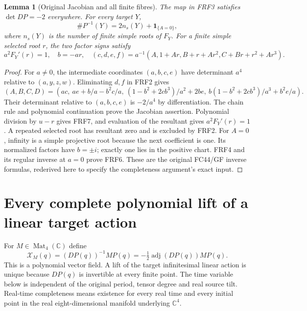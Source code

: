 \documentclass[11pt]{article}
\newtheorem{lemma}[theorem]{Lemma}
\newcommand{\C}{\mathbb C}
\newcommand{\adj}{\operatorname{adj}}
\begin{document}
\begin{lemma}[Original Jacobian and all finite fibres]\label{lem:fibres}
The map in FRF3 satisfies $\det DP=-2$ everywhere. For every target $Y$,
\[
 \#P^{-1}(Y)=2n_s(Y)+\mathbf1_{\{A=0\}},\tag{FRF6}
\]
where $n_s(Y)$ is the number of finite simple roots of $F_Y$.
For a finite simple selected root $r$, the two factor signs satisfy
\[
 a^2F_Y'(r)=1,\quad b=-ar,\quad
 (c,d,e,f)=a^{-1}(A,1+Ar,B+r+Ar^2,C+Br+r^2+Ar^3).\tag{FRF7}
\]
\end{lemma}
\begin{proof}
For $a\ne0$, the intermediate coordinates $(a,b,c,e)$ have determinant
$a^4$ relative to $(a,y,z,w)$. Eliminating $d,f$ in FRF2 gives
\[
 (A,B,C,D)=\left(ac,\ ae+b/a-b^2c/a,\
 (1-b^2+2cb^3)/a^2+2be,\
 b(1-b^2+2cb^3)/a^3+b^2e/a\right).
\]
Their determinant relative to $(a,b,c,e)$ is $-2/a^4$ by differentiation.
The chain rule and polynomial continuation prove the Jacobian assertion.
Polynomial division by $u-r$ gives FRF7, and evaluation of the resultant
gives $a^2F_Y'(r)=1$. A repeated selected root has resultant zero and is
excluded by FRF2. For $A=0$, infinity is a simple projective root because
the next coefficient is one. Its normalized factors have $b=\pm i$;
exactly one lies in the positive chart. FRF4 and its regular inverse at
$a=0$ prove FRF6. These are the original FC44/GF inverse formulas,
rederived here to specify the completeness argument's exact input.
\end{proof}

\section{Every complete polynomial lift of a linear target action}
For $M\in\operatorname{Mat}_4(\C)$ define
\[
 \mathcal X_M(q)=(DP(q))^{-1}MP(q)
       =-\tfrac12\adj(DP(q))MP(q).\tag{FRF8}
\]
This is a polynomial vector field. A lift of the target infinitesimal
linear action is unique because $DP(q)$ is invertible at every finite
point. The time variable below is independent of the original period,
tensor degree and real source tilt. Real-time completeness means existence
for every real time and every initial point in the real eight-dimensional
manifold underlying $\C^4$.
\end{document}
